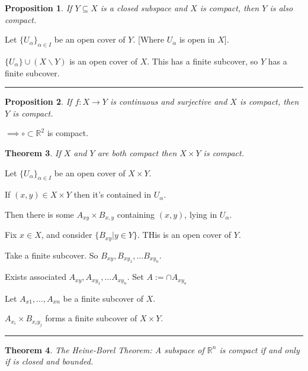 \documentclass[twoside]{article}
\newcounter{lecnum}
\renewcommand{\a}{\alpha}
\newtheorem{theorem}{Theorem}[lecnum]
\newtheorem{proposition}[theorem]{Proposition}
\newenvironment{proof}{{\bf Proof:}}{\hfill\rule{2mm}{2mm}}
\newcommand\R{\mathbb{R}}
\begin{document}
\begin{proposition}
    If $Y \subseteq X$ is a closed subspace and $X$ is compact, then $Y$ is also compact. 
\end{proposition}

\begin{proof}
    Let $\{U_\alpha\}_{\alpha\in I}$ be an open cover of $Y$. [Where $U_\a$ is open in $X$]. 

    $\{U_\alpha\} \cup (X \backslash Y)$ is an open cover of $X$. This has a finite subcover, so $Y$ has a finite subcover. 
\end{proof}

\begin{proposition}
    If $f: X \rightarrow Y$ is continuous and surjective and $X$ is compact, then $Y$ is compact. 
\end{proposition}

$\implies {\circ} \subset \R^2 $ is compact. 

\begin{theorem}
    If $X$ and $Y$ are both compact then $X \times Y$ is compact. 
\end{theorem}

\begin{proof}
    Let $\{U_\alpha\}_{\a\in I}$ be an open cover of $X \times Y$.     

    If $(x,y) \in X \times Y$ then it's contained in $U_\alpha$. 

    Then there is some $A_{xy}\times B_{x,y}$ containing $(x,y)$, lying in $U_\alpha$.

    Fix $x \in X$, and consider $\{B_{xy} \vert y \in Y\}$. THis is an open cover of $Y$. 

    Take a finite subcover. So $B_{xy},B_{{xy}_1},\dots B_{{xy}_n}$.

    Exists associated $A_{xy},A_{{xy}_1},\dots A_{{xy}_n}$. Set $A := \cap A_{{xy_o}} $

    Let $A_{x1}, \dots, A_{xn}$ be a finite subcover of $X$. 

    $A_{x_i} \times B_{x_iy_j}$ forms a finite subcover of $X \times Y$. 

\end{proof}


\begin{theorem}
    The Heine-Borel Theorem: A subspace of $\R^n$ is compact if and only if is closed and bounded. 

\end{theorem}
\end{document}
